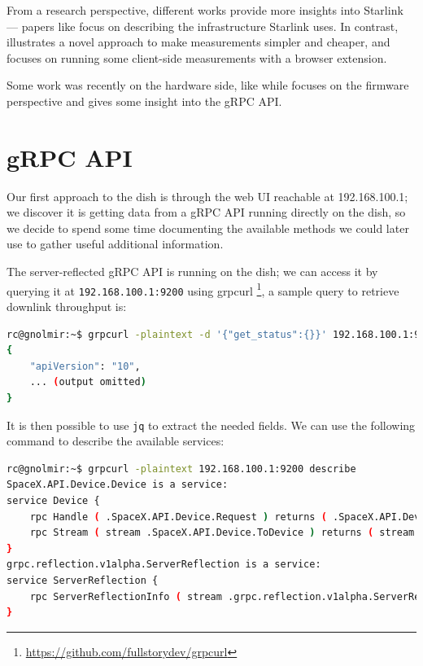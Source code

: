 \documentclass[IN,11pt,twoside,openright,idp,english]{tumthesis}
\begin{document}
From a research perspective, different works provide more insights into Starlink — papers like \cite{pan2023measuring} focus on describing the infrastructure Starlink uses. In contrast, \cite{izhikevich2023democratizing} illustrates a novel approach to make measurements simpler and cheaper, and \cite{browser-side} focuses on running some client-side measurements with a browser extension.
    
Some work was recently on the hardware side, like \cite{glitching} while \cite{quarkslab} focuses on the firmware perspective and gives some insight into the gRPC API.
    
\section{gRPC API}
    
Our first approach to the dish is through the web UI reachable at 192.168.100.1; we discover it is getting data from a gRPC API running directly on the dish, so we decide to spend some time documenting the available methods we could later use to gather useful additional information.
    
The server-reflected gRPC API is running on the dish; we can access it by querying it at \texttt{192.168.100.1:9200} using grpcurl \footnote{\url{https://github.com/fullstorydev/grpcurl}}, a sample query to retrieve downlink throughput is:
    
\begin{lstlisting}[language=bash]
rc@gnolmir:~$ grpcurl -plaintext -d '{"get_status":{}}' 192.168.100.1:9200 SpaceX.API.Device.Device/Handle
{
    "apiVersion": "10",
    ... (output omitted)
}
\end{lstlisting}

It is then possible to use \texttt{jq} to extract the needed fields. We can use the following command to describe the available services:
    
\begin{lstlisting}[language=bash]
rc@gnolmir:~$ grpcurl -plaintext 192.168.100.1:9200 describe
SpaceX.API.Device.Device is a service:
service Device {
    rpc Handle ( .SpaceX.API.Device.Request ) returns ( .SpaceX.API.Device.Response );
    rpc Stream ( stream .SpaceX.API.Device.ToDevice ) returns ( stream .SpaceX.API.Device.FromDevice );
}
grpc.reflection.v1alpha.ServerReflection is a service:
service ServerReflection {
    rpc ServerReflectionInfo ( stream .grpc.reflection.v1alpha.ServerReflectionRequest ) returns ( stream .grpc.reflection.v1alpha.ServerReflectionResponse );
}
\end{lstlisting}
    
\end{document}
